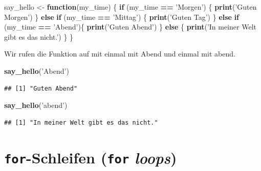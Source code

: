 \documentclass[]{book}
\newenvironment{Shaded}{\begin{snugshade}}{\end{snugshade}}
\newcommand{\ControlFlowTok}[1]{\textcolor[rgb]{0.13,0.29,0.53}{\textbf{#1}}}
\newcommand{\KeywordTok}[1]{\textcolor[rgb]{0.13,0.29,0.53}{\textbf{#1}}}
\newcommand{\NormalTok}[1]{#1}
\newcommand{\OperatorTok}[1]{\textcolor[rgb]{0.81,0.36,0.00}{\textbf{#1}}}
\newcommand{\StringTok}[1]{\textcolor[rgb]{0.31,0.60,0.02}{#1}}
\begin{document}
\begin{Shaded}
\begin{Highlighting}[]
\NormalTok{say_hello <-}\StringTok{ }\ControlFlowTok{function}\NormalTok{(my_time) \{}
  \ControlFlowTok{if}\NormalTok{ (my_time }\OperatorTok{==}\StringTok{ 'Morgen'}\NormalTok{) \{}
    \KeywordTok{print}\NormalTok{(}\StringTok{'Guten Morgen'}\NormalTok{)}
\NormalTok{  \} }\ControlFlowTok{else} \ControlFlowTok{if}\NormalTok{ (my_time }\OperatorTok{==}\StringTok{ 'Mittag'}\NormalTok{) \{}
    \KeywordTok{print}\NormalTok{(}\StringTok{'Guten Tag'}\NormalTok{)}
\NormalTok{  \} }\ControlFlowTok{else} \ControlFlowTok{if}\NormalTok{ (my_time }\OperatorTok{==}\StringTok{ 'Abend'}\NormalTok{)\{}
    \KeywordTok{print}\NormalTok{(}\StringTok{'Guten Abend'}\NormalTok{)}
\NormalTok{  \} }\ControlFlowTok{else}\NormalTok{ \{}
    \KeywordTok{print}\NormalTok{(}\StringTok{'In meiner Welt gibt es das nicht.'}\NormalTok{)}
\NormalTok{  \}}
\NormalTok{\}}
\end{Highlighting}
\end{Shaded}

Wir rufen die Funktion auf mit einmal mit Abend und einmal mit abend.

\begin{Shaded}
\begin{Highlighting}[]
\KeywordTok{say_hello}\NormalTok{(}\StringTok{'Abend'}\NormalTok{)}
\end{Highlighting}
\end{Shaded}

\begin{verbatim}
## [1] "Guten Abend"
\end{verbatim}

\begin{Shaded}
\begin{Highlighting}[]
\KeywordTok{say_hello}\NormalTok{(}\StringTok{'abend'}\NormalTok{)}
\end{Highlighting}
\end{Shaded}

\begin{verbatim}
## [1] "In meiner Welt gibt es das nicht."
\end{verbatim}

\hypertarget{for-schleifen-for-loops}{%
\section{\texorpdfstring{\texttt{for}-Schleifen (\texttt{for} \emph{loops})}{for-Schleifen (for loops)}}\label{for-schleifen-for-loops}}
\end{document}
